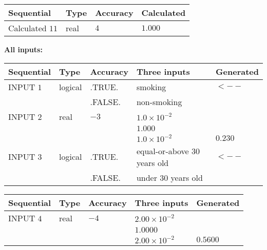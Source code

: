 \documentclass[12pt]{article}
\begin{document}
   
  
  
\noindent\begin{tabular}{|l|l|l|l|}
\hline
 Sequential & Type & Accuracy & Calculated \\ 
\hline
 
 
  Calculated $           11 $ & real & $            4  $ & 
 $ 1.000 $ 
 \\  \hline  
 \end{tabular}
   
   
   
   
\noindent\vspace{0.1in}\hspace{-0.08in} {\textbf{\Large{All inputs: }}}
   
   
  
  
\noindent\begin{tabular}{|l|l|l|l|l|}
\hline
 Sequential & Type & Accuracy & Three inputs & Generated \\ 
\hline
 
 
  INPUT $            1 $ & logical & .TRUE. & 
 smoking & 
  $ <-- $ 
  \\
  & & .FALSE. & 
  non-smoking & 
 \\  \hline  
 
 
  INPUT $            2 $ & real & $           -3  $ & $
 1.0 \times 10^{-2}
  $ & \\
  & & &  $
 1.000
  $ & \\
  & & &  $
 1.0 \times 10^{-2}
 $ & $ 0.230 $ 
 \\  \hline  
 
 
  INPUT $            3 $ & logical & .TRUE. & 
 equal-or-above 30 years old & 
  $ <-- $ 
  \\
  & & .FALSE. & 
  under 30 years old & 
 \\  \hline  
 \end{tabular}
   
   
  
  
\noindent\begin{tabular}{|l|l|l|l|l|}
\hline
 Sequential & Type & Accuracy & Three inputs & Generated \\ 
\hline
 
 
  INPUT $            4 $ & real & $           -4  $ & $
 2.00 \times 10^{-2}
  $ & \\
  & & &  $
 1.0000
  $ & \\
  & & &  $
 2.00 \times 10^{-2}
 $ & $ 0.5600 $ 
 \\  \hline  
 \end{tabular}
   
\end{document}
